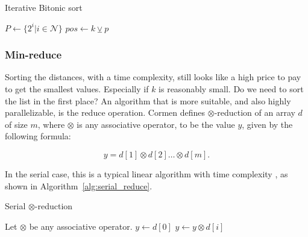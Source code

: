 \begin{algorithm}[ht]
\caption{Iterative Bitonic sort}
\label{alg:bitonic_sort}
\begin{algorithmic}
    \State $P \gets \{2^i|i \in \mathcal{N} \}$
                \State $pos \gets k \veebar p$ 
                     
                        \State {}
                    \EndIf
                        \State {}
                    \EndIf
                \EndIf
                \EndFor
            \EndFor
        \EndFor
    \EndFunction
    \Statex
    \State {}
    \EndIf
    \EndFunction
\end{algorithmic}
\end{algorithm}

\subsubsection{Min-reduce} %
\label{ssub:min_reduce}

Sorting the distances, with a  time complexity, still looks like a high price to pay to get the smallest values. Especially if $k$ is reasonably small. Do we need to sort the list in the first place? An algorithm that is more suitable, and also highly parallelizable, is the reduce operation. Cormen \cite{Cormen:2001} defines $\otimes$-reduction of an array $d$ of size $m$, where $\otimes$ is any associative operator, to be the value $y$, given by the following formula:

     $$ y = d[1] \otimes d[2] \dots \otimes d[m].$$

In the serial case, this is a typical linear algorithm with time complexity , as shown in Algorithm~\ref{alg:serial_reduce}. 

\begin{algorithm}[ht]
\caption{Serial $\otimes$-reduction}
\label{alg:serial_reduce}
\begin{algorithmic}
    \State Let $\otimes$ be any associative operator.
        \State $y \gets d[0]$
            \State $y \gets y \otimes d[i]$
        \EndFor
    \EndFunction
\end{algorithmic}
\end{algorithm}

